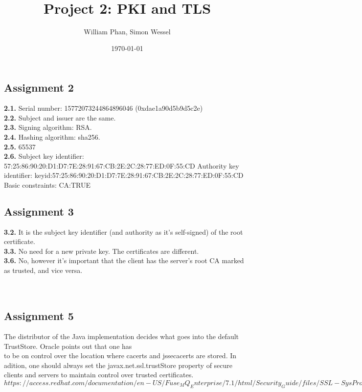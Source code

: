 \documentclass[11pt,a4paper]{article}
\title{Project 2: PKI and TLS} %
\author{William Phan, Simon Wessel}
\date{\today} %
\begin{document}
\maketitle %

\setcounter{secnumdepth}{0}

\subsection{Assignment 2}
\textbf{2.1.} Serial number: 15772073244864896046 (0xdae1a90d5b9d5c2e)\\
\textbf{2.2.} Subject and issuer are the same.\\
\textbf{2.3.} Signing algorithm: RSA.\\
\textbf{2.4.} Hashing algorithm: sha256.\\
\textbf{2.5.} 65537\\
\textbf{2.6.} Subject key identifier:
     57:25:86:90:20:D1:D7:7E:28:91:67:CB:2E:2C:28:77:ED:0F:55:CD\newline
     \indent Authority key identifier:
     keyid:57:25:86:90:20:D1:D7:7E:28:91:67:CB:2E:2C:28:77:ED:0F:55:CD\\
     Basic constraints:
     CA:TRUE
\\
\subsection{Assignment 3}
\textbf{3.2.} It is the subject key identifier (and authority as it's self-signed) of the root certificate.\\
\textbf{3.3.} No need for a new private key. The certificates are different.\\
\textbf{3.6.} No, however it's important that the client has the server's root CA marked as trusted, and vice versa.\\
\\\\
\subsection{Assignment 5}
The distributor of the Java implementation decides what goes into the default TrustStore. Oracle points out that one has \\to be on control over the location where cacerts and jssecacerts are stored. In adition, one should always set the javax.net.ssl.trustStore property of secure clients and servers to maintain control over trusted certificates.
$https://access.redhat.com/documentation/en-US/Fuse_MQ_Enterprise/7.1/html/Security_Guide/files/SSL-SysProps.html$
\end{document}
